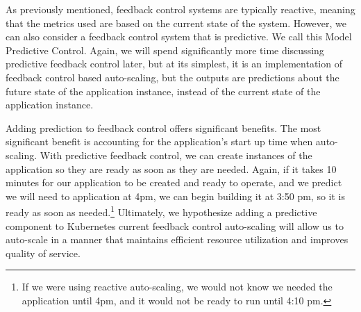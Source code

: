 As previously mentioned, feedback control systems are typically reactive,
meaning that the metrics used are based on the current state of the system.
However, we can also consider a feedback control system that is predictive. We
call this Model Predictive Control.\cite[pg.
27]{auto-scaling-techniques-for-elastic-applications-in-cloud-environments}
Again, we will spend significantly more time discussing predictive feedback
control later, but at its simplest, it is an implementation of feedback control
based auto-scaling, but the outputs are predictions about the future state of
the application instance, instead of the current state of the application instance.

Adding prediction to feedback control offers significant benefits. The most
significant benefit is accounting for the application's start up time when auto-scaling.
With predictive feedback control, we can create instances of the application
so they are ready as soon as they are needed. Again, if it takes 10
minutes for our application to be created and ready to operate, and we predict
we will need to application at 4pm, we can begin building it at 3:50 pm, so it
is ready as soon as needed.\footnote{If we were using reactive auto-scaling, we
would not know we needed the application until 4pm, and it would not be ready to
run until 4:10 pm.}
Ultimately, we hypothesize adding a predictive component to
Kubernetes current feedback control auto-scaling will allow us to auto-scale in
a manner that maintains efficient resource utilization and improves quality of
service.
